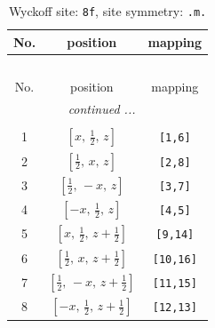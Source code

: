 \documentclass[fleqn,8pt]{jsarticle}
\begin{document}
\begin{longtable}{ccc}
\caption{Wyckoff site: {\tt 8f}, site symmetry: {\tt .m.}}
 \\
 \hline \hline
No. & position & mapping \\ \hline \endfirsthead

\multicolumn{2}{l}{\tablename\ \thetable{}} \\
 \hline \hline
No. & position & mapping \\ \hline \endhead

 \hline \hline
\multicolumn{2}{r}{\footnotesize\it continued ...} \\ \endfoot

 \hline \hline
\multicolumn{2}{r}{} \\ \endlastfoot

1 & $\left[ x,\, \frac{1}{2},\, z \right]$ & {\tt [1,6]} \\ \hline
2 & $\left[ \frac{1}{2},\, x,\, z \right]$ & {\tt [2,8]} \\ \hline
3 & $\left[ \frac{1}{2},\, - x,\, z \right]$ & {\tt [3,7]} \\ \hline
4 & $\left[ - x,\, \frac{1}{2},\, z \right]$ & {\tt [4,5]} \\ \hline
5 & $\left[ x,\, \frac{1}{2},\, z + \frac{1}{2} \right]$ & {\tt [9,14]} \\ \hline
6 & $\left[ \frac{1}{2},\, x,\, z + \frac{1}{2} \right]$ & {\tt [10,16]} \\ \hline
7 & $\left[ \frac{1}{2},\, - x,\, z + \frac{1}{2} \right]$ & {\tt [11,15]} \\ \hline
8 & $\left[ - x,\, \frac{1}{2},\, z + \frac{1}{2} \right]$ & {\tt [12,13]} \\
\end{longtable}
\renewcommand{\arraystretch}{1.2}
\end{document}
